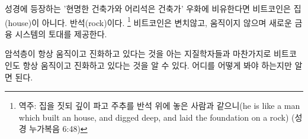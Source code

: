 \begin{comment}
	Arguably, in this parable of the wise and the foolish builders Bitcoin
	isn't the house. It is the rock. Unchangeable, unmoving, providing the
	foundation for a new financial system.
\end{comment}
성경에 등장하는 '현명한 건축가와 어리석은 건축가' 우화에 비유한다면 비트코인은 집(house)이 아니다. 반석(rock)이다.
\footnote{역주: 집을 짓되 깊이 파고 주추를 반석 위에 놓은 사람과 같으니(he is like a man which built an house, and digged deep, and laid the foundation on a rock) (성경 누가복음 6:48)}
비트코인은 변치않고, 움직이지 않으며 새로운 금융 시스템의 토대를 제공한다.

\begin{comment}
	Just like geologists, who know that rock formations are always moving
	and evolving, one can see that Bitcoin is always moving and evolving as
	well. You just have to know where to look and how to look at it.
\end{comment}
암석층이 항상 움직이고 진화하고 있다는 것을 아는 지질학자들과 마찬가지로
비트코인도 항상 움직이고 진화하고 있다는 것을 알 수 있다.
어디를 어떻게 봐야 하는지만 알면 된다.
		
